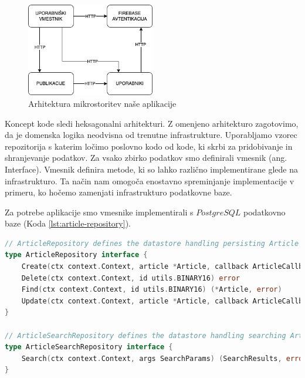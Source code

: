 \documentclass[a4paper, 12pt]{book}
\begin{document}
\begin{figure}[h]
\begin{center}
\includegraphics[width=0.5\textwidth]{slike/architecture.png}
\end{center}
\caption{ Arhitektura mikrostoritev naše aplikacije }
\label{app-architecture}
\end{figure}



Koncept kode sledi heksagonalni arhitekturi. Z omenjeno arhitekturo zagotovimo, da je domenska logika neodvisna od trenutne infrastrukture. Uporabljamo vzorec repozitorija s katerim ločimo poslovno kodo od kode, ki skrbi za pridobivanje in shranjevanje podatkov. Za vsako zbirko podatkov smo definirali vmesnik (ang. Interface). Vmesnik definira metode, ki so lahko različno implementirane glede na infrastrukturo. Ta način nam omogoča enostavno spreminjanje implementacije v primeru, ko hočemo zamenjati infrastrukturo podatkovne baze. 

Za potrebe aplikacije smo vmesnike implementirali s $PostgreSQL$ podatkovno baze (Koda \ref{lst:article-repository}). 
\begin{lstlisting}[language=go, style=mystyle,caption={Vmesnik, ki definira repozitorij za publikacije},label=lst:article-repository]
// ArticleRepository defines the datastore handling persisting Article records.
type ArticleRepository interface {
	Create(ctx context.Context, article *Article, callback ArticleCallbackFn) (*Article, error)
	Delete(ctx context.Context, id utils.BINARY16) error
	Find(ctx context.Context, id utils.BINARY16) (*Article, error)
	Update(ctx context.Context, article *Article, callback ArticleCallbackFn) (*Article, error)
}

// ArticleSearchRepository defines the datastore handling searching Article records.
type ArticleSearchRepository interface {
	Search(ctx context.Context, args SearchParams) (SearchResults, error)
}
\end{lstlisting}
\end{document}
